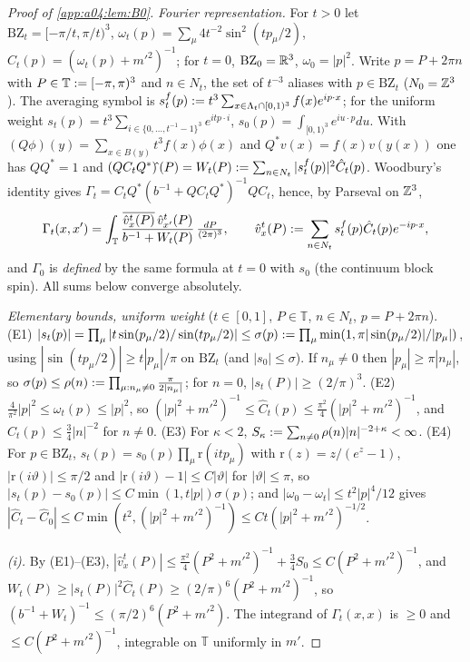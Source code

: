 \begin{proof}[Proof of \cref{app:a04:lem:B0}]
\emph{Fourier representation.} For $t>0$ let $\mathrm{BZ}_t=[-\pi/t,\pi/t)^3$, $\omega_t(p)=\sum_\mu4t^{-2}\sin^2(tp_\mu/2)$, $\hat C_t(p)=(\omega_t(p)+m'^2)^{-1}$; for $t=0$, $\mathrm{BZ}_0=\mathbb R^3$, $\omega_0=|p|^2$. Write $p=P+2\pi n$ with $P\in\mathbb T:=[-\pi,\pi)^3$ and $n\in N_t$, the set of $t^{-3}$ aliases with $p\in\mathrm{BZ}_t$ ($N_0=\mathbb Z^3$). The averaging symbol is $s^f_t(p):= t^3\sum_{x\in\Lambda_t\cap[0,1)^3}f(x)e^{ip\cdot x}$; for the uniform weight $s_t(p)=t^3\sum_{i\in\{0,\dots,t^{-1}-1\}^3}e^{itp\cdot i}$, $s_0(p)=\int_{[0,1)^3}e^{iu\cdot p}du$. With $(Q\phi)(y)=\sum_{x\in B(y)}t^3f(x)\phi(x)$ and $Q^*v(x)=f(x)v(y(x))$ one has $QQ^*=1$ and $(QC_tQ^*)\hat{}\,(P)=W_t(P):=\sum_{n\in N_t}|s^f_t(p)|^2\hat C_t(p)$. Woodbury's identity gives $\Gamma_t=C_tQ^*(b^{-1}+QC_tQ^*)^{-1}QC_t$, hence, by Parseval on $\mathbb Z^3$,
\[
\Gamma_t(x,x')=\int_{\mathbb T}\frac{\overline{\hat v^t_x(P)}\,\hat v^t_{x'}(P)}{b^{-1}+W_t(P)}\,\tfrac{dP}{(2\pi)^3},\qquad \hat v^t_x(P):=\sum_{n\in N_t}s^f_t(p)\hat C_t(p)e^{-ip\cdot x},
\]
and $\Gamma_0$ is \emph{defined} by the same formula at $t=0$ with $s_0$ (the continuum block spin). All sums below converge absolutely.

\emph{Elementary bounds, uniform weight} ($t\in[0,1]$, $P\in\mathbb T$, $n\in N_t$, $p=P+2\pi n$). (E1) $|s_t(p)|=\prod_\mu|t\sin(p_\mu/2)/\sin(tp_\mu/2)|\le\sigma(p):=\prod_\mu\min(1,\pi|\sin(p_\mu/2)|/|p_\mu|)$, using $|\sin(tp_\mu/2)|\ge t|p_\mu|/\pi$ on $\mathrm{BZ}_t$ (and $|s_0|\le\sigma$). If $n_\mu\ne0$ then $|p_\mu|\ge\pi|n_\mu|$, so $\sigma(p)\le\rho(n):=\prod_{\mu:n_\mu\ne0}\frac\pi{2|n_\mu|}$; for $n=0$, $|s_t(P)|\ge(2/\pi)^3$. (E2) $\frac4{\pi^2}|p|^2\le\omega_t(p)\le|p|^2$, so $(|p|^2+m'^2)^{-1}\le\hat C_t(p)\le\frac{\pi^2}4(|p|^2+m'^2)^{-1}$, and $\hat C_t(p)\le\frac34|n|^{-2}$ for $n\ne0$. (E3) For $\kappa<2$, $S_\kappa:=\sum_{n\ne0}\rho(n)|n|^{-2+\kappa}<\infty$. (E4) For $p\in\mathrm{BZ}_t$, $s_t(p)=s_0(p)\prod_\mu\mathrm r(itp_\mu)$ with $\mathrm r(z)=z/(e^z-1)$, $|\mathrm r(i\vartheta)|\le\pi/2$ and $|\mathrm r(i\vartheta)-1|\le C|\vartheta|$ for $|\vartheta|\le\pi$, so $|s_t(p)-s_0(p)|\le C\min(1,t|p|)\sigma(p)$; and $|\omega_0-\omega_t|\le t^2|p|^4/12$ gives $|\hat C_t-\hat C_0|\le C\min(t^2,(|p|^2+m'^2)^{-1})\le Ct(|p|^2+m'^2)^{-1/2}$.

\emph{(i).} By (E1)--(E3), $|\hat v^t_x(P)|\le\frac{\pi^2}4(P^2+m'^2)^{-1}+\frac34S_0\le C(P^2+m'^2)^{-1}$, and $W_t(P)\ge|s_t(P)|^2\hat C_t(P)\ge(2/\pi)^6(P^2+m'^2)^{-1}$, so $(b^{-1}+W_t)^{-1}\le(\pi/2)^6(P^2+m'^2)$. The integrand of $\Gamma_t(x,x)$ is $\ge0$ and $\le C(P^2+m'^2)^{-1}$, integrable on $\mathbb T$ uniformly in $m'$.


\end{proof}
